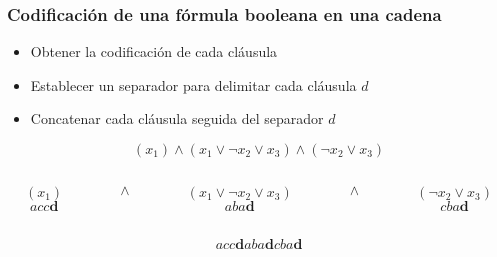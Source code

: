 \documentclass{beamer}
\begin{document}
\begin{frame}
    \frametitle{Codificación de una fórmula booleana en una cadena}
    
    \begin{itemize}
        \item Obtener la codificación de cada cláusula
              \pause
        \item Establecer un separador para delimitar cada cláusula $d$
              \pause
        \item Concatenar cada cláusula seguida del separador $d$
    \end{itemize}
    
    \pause
    
    \begin{Large}
        $$(x_1)\wedge (x_1\vee \neg x_2 \vee x_3)\wedge (\neg x_2\vee x_3)$$
        
        \pause
        
        \begin{columns}
            \begin{column}{1cm}
                $$(x_1)$$
                $$acc\mathbf{d}$$
            \end{column}
            \pause
            \begin{column}{0.2cm}
                $$\wedge$$
                $$\ $$
            \end{column}
            \begin{column}{3cm}
                $$(x_1\vee \neg x_2 \vee x_3)$$
                $$aba\mathbf{d}$$
            \end{column}
            \pause
            \begin{column}{0.2cm}
                $$\wedge$$
                $$\ $$
            \end{column}
            \begin{column}{2cm}
                $$(\neg x_2\vee x_3)$$
                $$cba\mathbf{d}$$
            \end{column}
        \end{columns}
        \pause
        
        $$acc\mathbf{d}aba\mathbf{d}cba\mathbf{d}$$
    \end{Large}
    
    
\end{frame}
\end{document}
